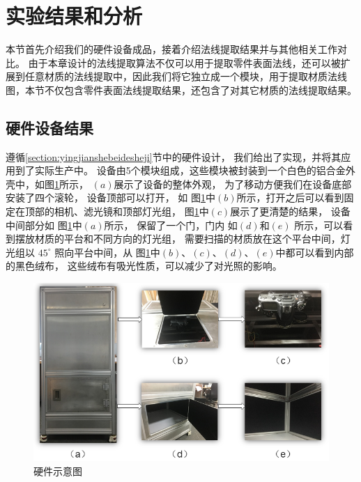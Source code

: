 \section{实验结果和分析}

本节首先介绍我们的硬件设备成品，接着介绍法线提取结果并与其他相关工作对比。
由于本章设计的法线提取算法不仅可以用于提取零件表面法线，还可以被扩展到任意材质的法线提取中，因此我们将它独立成一个模块，用于提取材质法线图，本节不仅包含零件表面法线提取结果，还包含了对其它材质的法线提取结果。

\subsection{硬件设备结果}

遵循\ref{section:yingjianshebeidesheji}节中的硬件设计，
我们给出了实现，并将其应用到了实际生产中。
设备由5个模块组成，这些模块被封装到一个白色的铝合金外壳中，如图\ref{fig:yingjianjieguo}所示，
$(a)$展示了设备的整体外观，
为了移动方便我们在设备底部安装了四个滚轮，
设备顶部可以打开，
如
图\ref{fig:yingjianjieguo}中$(b)$所示，打开之后可以看到固定在顶部的相机、滤光镜和顶部灯光组，
图\ref{fig:yingjianjieguo}中$(c)$展示了更清楚的结果，
设备中间部分如
图\ref{fig:yingjianjieguo}中$(a)$所示，
保留了一个门，门内
如$(d)$和$(e)$
所示，可以看到摆放材质的平台和不同方向的灯光组，
需要扫描的材质放在这个平台中间，灯光组以
${45}^{\circ}$
照向平台中间，从
图\ref{fig:yingjianjieguo}中$(b)$、$(c)$、$(d)$、$(e)$中都可以看到内部的黑色绒布，
这些绒布有吸光性质，可以减少了对光照的影响。

\begin{figure}[htbp]
\centering
\centerline{\includegraphics[width=1.0\linewidth]{figures/yingjianjieguo.png}}
\caption{硬件示意图}
\label{fig:yingjianjieguo}
\end{figure}

